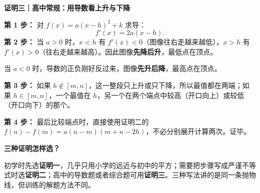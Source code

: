 \begin{proofbox}
\textbf{\textcolor{CProof}{证明三｜高中常规：用导数看上升与下降}}



\textbf{第 1 步：} 对 $f(x)=a(x-h)^2+k$ 求导：
\[
 f'(x)=2a(x-h).
\]
\textbf{第 2 步：} 当 $a>0$ 时，$x<h$ 有 $f'(x)<0$（图像往右走越来越低），$x>h$ 有 $f'(x)>0$（往右走越来越高）。因此图像\textbf{先降后升}，最低点在顶点。

当 $a<0$ 时，导数的正负刚好反过来，图像\textbf{先升后降}，最高点在顶点。

\textbf{第 3 步：} 如果 $h\notin[m,n]$，这一整段只上升或只下降，所以最值都在两端；如果 $h\in[m,n]$，一个最值在 $h$，另一个在两个端点中较高（开口向上）或较低（开口向下）的那个。

\textbf{第 4 步：} 最后比较端点时，直接使用证明二的
$ f(n)-f(m)=a(n-m)(m+n-2h) $，不必分别展开计算两次。证毕。

\medskip
\textbf{\textcolor{CProof}{三种证明怎样选？}}

初学时先选\textbf{证明一}，几乎只用小学的远近与初中的平方；需要把步骤写成严谨不等式时选\textbf{证明二}；高中的导数题或者综合题可用\textbf{证明三}。三种写法讲的是同一条抛物线，但训练的解题方法不同。
\end{proofbox}
